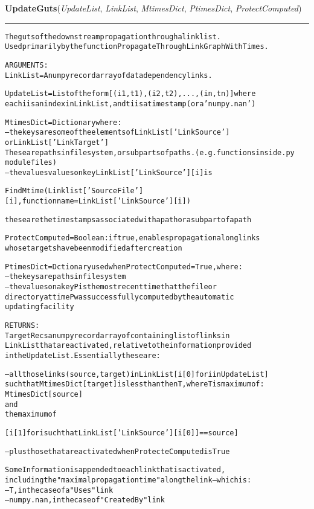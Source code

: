 \hspace{.8\funcindent}\begin{boxedminipage}{\funcwidth}

    \raggedright \textbf{UpdateGuts}(\textit{UpdateList}, \textit{LinkList}, \textit{MtimesDict}, \textit{PtimesDict}, \textit{ProtectComputed})

    \vspace{-1.5ex}

    \rule{\textwidth}{0.5\fboxrule}
\setlength{\parskip}{2ex}
\begin{alltt}

The guts of the downstream propagation through a linklist.   
Used primarily by the function PropagateThroughLinkGraphWithTimes.

ARGUMENTS:
LinkList = A numpy record array of data dependency links.

UpdateList = List of the form [(i1,t1),(i2,t2), ... , (in,tn)] where 
each  i is an index in LinkList, and ti is a time stamp (or a 'numpy.nan')

MtimesDict = Dictionary where:
-- the keys are some of the elements of LinkList['LinkSource'] 
        or LinkList['LinkTarget'] 
   These are paths in filesystem, or subparts of paths. (e.g. functions inside .py 
   module files)
-- the values values on key LinkList['LinkSource'][i] is 

FindMtime(Linklist['SourceFile'][i],functionname=LinkList['LinkSource'][i]) 

these are the timestamps associated with a path or a subpart of a path
                        
ProtectComputed = Boolean : if true, enables propagation along links 
whose targets have been modified after creation

PtimesDict = Dctionary used when ProtectComputed = True, where:
-- the keys are paths in filesystem
-- the values on a key P is the most recent time that the file or 
directory at time P was successfully computed by the automatic 
updating facility  
                
RETURNS:
TargetRecs a numpy record array of containing list of links in
LinkList that are activated, relative to the information provided 
in the UpdateList.  Essentially these are:

-- all those links (source,target) in LinkList[i[0] for i in UpdateList]  
such that MtimesDict[target] is less than then T, where T is maximum of:
        MtimesDict[source] 
and
        the maximum of 
        
        [i[1] for i such that LinkList['LinkSource'][i[0]] == source]

-- plus those that are activated when ProtecteComputed is True                  
                        
Some Information is appended to each link that is activated, 
including the "maximal propagation time" along the link -- which is:
        -- T, in the case of a "Uses" link   
        -- numpy.nan, in the case of "CreatedBy" link
                
\end{alltt}

\setlength{\parskip}{1ex}
    \end{boxedminipage}

